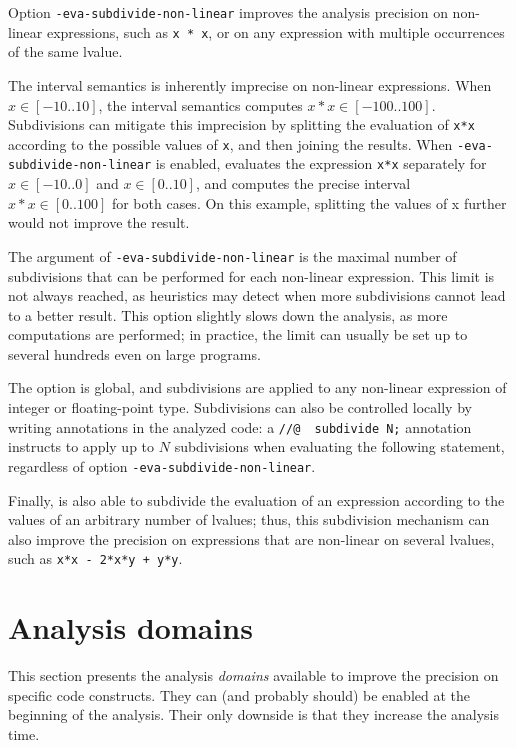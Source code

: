 \documentclass{frama-c-book}
\begin{document}
Option \verb|-eva-subdivide-non-linear| improves the analysis precision on
non-linear expressions, such as \lstinline|x * x|,
or on any expression with multiple occurrences of the same lvalue.

The interval semantics is inherently imprecise on non-linear expressions.
When $x \in [-10..10]$, the interval semantics computes $x*x \in [-100..100]$.
Subdivisions can mitigate this imprecision by splitting the evaluation of
\lstinline|x*x| according to the possible values of \lstinline|x|,
and then joining the results.
When \verb|-eva-subdivide-non-linear| is enabled, \Eva{} evaluates the
expression \lstinline|x*x| separately for $x \in [-10..0]$ and $x \in [0..10]$,
and computes the precise interval $x*x \in [0..100]$ for both cases.
On this example, splitting the values of x further would not improve the result.

The argument of \verb|-eva-subdivide-non-linear| is the maximal number of
subdivisions that can be performed for each non-linear expression.
This limit is not always reached, as heuristics may detect when more
subdivisions cannot lead to a better result.
This option slightly slows down the analysis, as more computations are performed;
in practice, the limit can usually be set up to several hundreds even on
large programs.

The option is global, and subdivisions are applied to any non-linear expression
of integer or floating-point type.
Subdivisions can also be controlled locally by writing annotations
in the analyzed code:
a \lstinline|//@  subdivide N;| annotation instructs \Eva{}
to apply up to $N$ subdivisions when evaluating the following statement,
regardless of option \verb|-eva-subdivide-non-linear|.

Finally, \Eva is also able to subdivide the evaluation of an expression
according to the values of an arbitrary number of lvalues;
thus, this subdivision mechanism can also improve the precision on expressions
that are non-linear on several lvalues, such as \lstinline|x*x - 2*x*y + y*y|.

\section{Analysis domains}
\label{sec:eva}

This section presents the analysis \emph{domains}
available to improve the precision on specific code constructs.
They can (and probably should) be enabled at the beginning of the analysis.
Their only downside is that they increase the analysis time.
\end{document}
